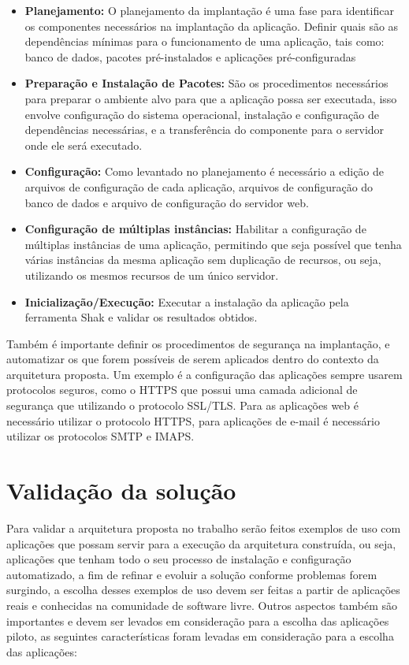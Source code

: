 \begin{itemize}
  \item  \textbf{Planejamento:} O planejamento da implantação é uma fase para
  identificar os componentes necessários na implantação da aplicação. Definir
  quais são as dependências mínimas
  para o funcionamento de uma aplicação, tais como: banco de dados, pacotes
  pré-instalados e aplicações pré-configuradas
  \item  \textbf{Preparação e Instalação de Pacotes:} São os procedimentos necessários
   para preparar o ambiente alvo para que a aplicação
  possa ser executada, isso envolve configuração do sistema operacional, instalação
  e configuração de dependências necessárias, e a transferência do componente
  para o servidor onde ele será executado.
  \item  \textbf{Configuração:} Como levantado no planejamento é necessário a
  edição de arquivos de configuração
  de cada aplicação, arquivos de configuração do banco de dados e arquivo de configuração
  do servidor web.
  \item  \textbf{Configuração de múltiplas instâncias:} Habilitar a configuração
  de múltiplas instâncias de uma aplicação, permitindo que seja possível que
  tenha várias instâncias da mesma aplicação sem duplicação de recursos, ou seja,
  utilizando os mesmos recursos de um único servidor.
  \item  \textbf{Inicialização/Execução:} Executar a instalação da aplicação pela
  ferramenta Shak e validar os resultados obtidos.
\end{itemize}

Também é importante definir os procedimentos de segurança na implantação, e automatizar os que forem possíveis de serem aplicados dentro do contexto da arquitetura proposta. Um exemplo 
é a configuração das aplicações sempre usarem protocolos seguros, como o HTTPS 
que possui uma camada adicional de segurança que utilizando o protocolo SSL/TLS. 
Para as aplicações web é necessário utilizar o protocolo HTTPS, para aplicações
de e-mail é necessário utilizar os protocolos SMTP e IMAPS.
 
\section{Validação da solução}
\label{subsection:validacao}

Para validar a arquitetura proposta no trabalho serão feitos exemplos de uso
com aplicações que possam servir para a execução da arquitetura construída, ou seja,
aplicações que tenham todo o seu processo de instalação e configuração automatizado, a
fim de refinar e evoluir a solução conforme problemas forem surgindo, a escolha
desses exemplos de uso devem ser feitas a partir de aplicações reais e
conhecidas na comunidade de software livre. Outros aspectos também são importantes e
devem ser levados em consideração para a escolha das
aplicações piloto, as seguintes características foram levadas em consideração
para a escolha das aplicações:


